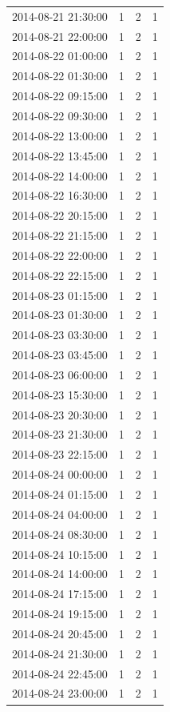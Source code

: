\begin{tabular}{lrrr}
2014-08-21 21:30:00 & 1 & 2 & 1 \\
2014-08-21 22:00:00 & 1 & 2 & 1 \\
2014-08-22 01:00:00 & 1 & 2 & 1 \\
2014-08-22 01:30:00 & 1 & 2 & 1 \\
2014-08-22 09:15:00 & 1 & 2 & 1 \\
2014-08-22 09:30:00 & 1 & 2 & 1 \\
2014-08-22 13:00:00 & 1 & 2 & 1 \\
2014-08-22 13:45:00 & 1 & 2 & 1 \\
2014-08-22 14:00:00 & 1 & 2 & 1 \\
2014-08-22 16:30:00 & 1 & 2 & 1 \\
2014-08-22 20:15:00 & 1 & 2 & 1 \\
2014-08-22 21:15:00 & 1 & 2 & 1 \\
2014-08-22 22:00:00 & 1 & 2 & 1 \\
2014-08-22 22:15:00 & 1 & 2 & 1 \\
2014-08-23 01:15:00 & 1 & 2 & 1 \\
2014-08-23 01:30:00 & 1 & 2 & 1 \\
2014-08-23 03:30:00 & 1 & 2 & 1 \\
2014-08-23 03:45:00 & 1 & 2 & 1 \\
2014-08-23 06:00:00 & 1 & 2 & 1 \\
2014-08-23 15:30:00 & 1 & 2 & 1 \\
2014-08-23 20:30:00 & 1 & 2 & 1 \\
2014-08-23 21:30:00 & 1 & 2 & 1 \\
2014-08-23 22:15:00 & 1 & 2 & 1 \\
2014-08-24 00:00:00 & 1 & 2 & 1 \\
2014-08-24 01:15:00 & 1 & 2 & 1 \\
2014-08-24 04:00:00 & 1 & 2 & 1 \\
2014-08-24 08:30:00 & 1 & 2 & 1 \\
2014-08-24 10:15:00 & 1 & 2 & 1 \\
2014-08-24 14:00:00 & 1 & 2 & 1 \\
2014-08-24 17:15:00 & 1 & 2 & 1 \\
2014-08-24 19:15:00 & 1 & 2 & 1 \\
2014-08-24 20:45:00 & 1 & 2 & 1 \\
2014-08-24 21:30:00 & 1 & 2 & 1 \\
2014-08-24 22:45:00 & 1 & 2 & 1 \\
2014-08-24 23:00:00 & 1 & 2 & 1 \\

\end{tabular}
